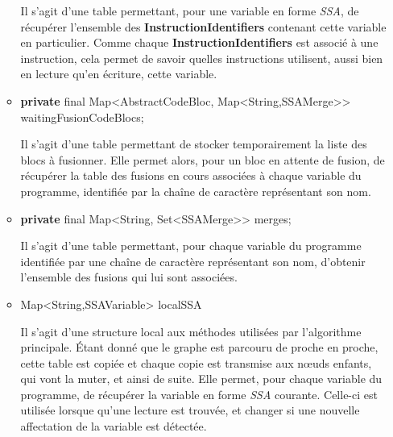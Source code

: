 \documentclass[
]{article}
\newenvironment{Shaded}{}{}
\newcommand{\BuiltInTok}[1]{#1}
\newcommand{\DataTypeTok}[1]{\textcolor[rgb]{0.56,0.13,0.00}{#1}}
\newcommand{\KeywordTok}[1]{\textcolor[rgb]{0.00,0.44,0.13}{\textbf{#1}}}
\newcommand{\NormalTok}[1]{#1}
\newcommand{\OperatorTok}[1]{\textcolor[rgb]{0.40,0.40,0.40}{#1}}
\begin{document}
\begin{itemize}
\begin{itemize}
    Il s'agit d'une table permettant, pour une variable en forme
    \emph{SSA}, de récupérer l'ensemble des
    \textbf{InstructionIdentifiers} contenant cette variable en
    particulier. Comme chaque \textbf{InstructionIdentifiers} est
    associé à une instruction, cela permet de savoir quelles
    instructions utilisent, aussi bien en lecture qu'en écriture, cette
    variable.
  \item
\begin{Shaded}
\begin{Highlighting}[]
\KeywordTok{private} \DataTypeTok{final} \BuiltInTok{Map}\OperatorTok{\textless{}}\NormalTok{AbstractCodeBloc}\OperatorTok{,} \BuiltInTok{Map}\OperatorTok{\textless{}}\BuiltInTok{String}\OperatorTok{,}\NormalTok{SSAMerge}\OperatorTok{\textgreater{}\textgreater{}}\NormalTok{ waitingFusionCodeBlocs}\OperatorTok{;}
\end{Highlighting}
\end{Shaded}

    Il s'agit d'une table permettant de stocker temporairement la liste
    des blocs à fusionner. Elle permet alors, pour un bloc en attente de
    fusion, de récupérer la table des fusions en cours associées à
    chaque variable du programme, identifiée par la chaîne de caractère
    représentant son nom.
  \item
\begin{Shaded}
\begin{Highlighting}[]
\KeywordTok{private} \DataTypeTok{final} \BuiltInTok{Map}\OperatorTok{\textless{}}\BuiltInTok{String}\OperatorTok{,} \BuiltInTok{Set}\OperatorTok{\textless{}}\NormalTok{SSAMerge}\OperatorTok{\textgreater{}\textgreater{}}\NormalTok{ merges}\OperatorTok{;}
\end{Highlighting}
\end{Shaded}

    Il s'agit d'une table permettant, pour chaque variable du programme
    identifiée par une chaîne de caractère représentant son nom,
    d'obtenir l'ensemble des fusions qui lui sont associées.
  \item
\begin{Shaded}
\begin{Highlighting}[]
\BuiltInTok{Map}\OperatorTok{\textless{}}\BuiltInTok{String}\OperatorTok{,}\NormalTok{SSAVariable}\OperatorTok{\textgreater{}}\NormalTok{ localSSA}
\end{Highlighting}
\end{Shaded}

    Il s'agit d'une structure local aux méthodes utilisées par
    l'algorithme principale. Étant donné que le graphe est parcouru de
    proche en proche, cette table est copiée et chaque copie est
    transmise aux nœuds enfants, qui vont la muter, et ainsi de suite.
    Elle permet, pour chaque variable du programme, de récupérer la
    variable en forme \emph{SSA} courante. Celle-ci est utilisée lorsque
    qu'une lecture est trouvée, et changer si une nouvelle affectation
    de la variable est détectée.
  \end{itemize}


\end{itemize}
\end{document}

